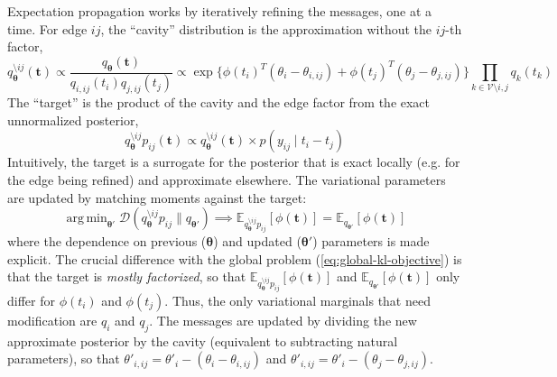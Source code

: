 \documentclass{article}
\DeclareMathOperator*{\argmin}{arg\,min}
\begin{document}
Expectation propagation works by iteratively refining the messages, one at a time. For edge $ij$, the ``cavity'' distribution is the approximation without the $ij$-th factor,
\[
q^{\setminus ij}_{\bm \theta}(\bm t) \propto \frac{q_{\bm \theta}(\bm t)}{q_{i,ij}(t_i) q_{j,ij}(t_j)} \propto \exp\{ \phi(t_i)^T (\theta_i - \theta_{i,ij}) + \phi(t_j)^T (\theta_j - \theta_{j,ij})\} \prod_{k \in \mathcal{V} \setminus i,j} q_k(t_k)
\]
The ``target'' is the product of the cavity and the edge factor from the exact unnormalized posterior,
\[
q^{\setminus ij}_{\bm \theta} p_{ij} (\bm t) \propto q^{\setminus ij}_{\bm \theta}(\bm t) \times p(y_{ij} \mid t_i - t_j)
\]
Intuitively, the target is a surrogate for the posterior that is exact locally (e.g. for the edge being refined) and approximate elsewhere. The variational parameters are updated by matching moments against the target:
\[
\argmin_{\bm \theta'} \mathcal{D}( q^{\setminus ij}_{\bm \theta} p_{ij} \| q_{\bm \theta'} ) \implies \mathbb{E}_{q^{\setminus ij}_{\bm \theta} p_{ij}}[\phi(\bm t)] = \mathbb{E}_{q_{\bm \theta'}}[\phi(\bm t)]
\]
where the dependence on previous ($\bm \theta$) and updated ($\bm \theta'$) parameters is made explicit. The crucial difference with the global problem (\ref{eq:global-kl-objective}) is that the target is \emph{mostly factorized}, so that $\mathbb{E}_{q^{\setminus ij}_{\bm \theta} p_{ij}}[\phi(\bm t)]$ and $\mathbb{E}_{q_{\bm \theta'}}[\phi(\bm t)]$ only differ for $\phi(t_i)$ and $\phi(t_j)$. Thus, the only variational marginals that need modification are $q_{i}$ and $q_{j}$. The messages are updated by dividing the new approximate posterior by the cavity (equivalent to subtracting natural parameters), so that $\theta'_{i,ij} = \theta'_i - (\theta_i - \theta_{i,ij})$ and $\theta'_{i,ij} = \theta'_i - (\theta_j - \theta_{j,ij})$. 
\end{document}

